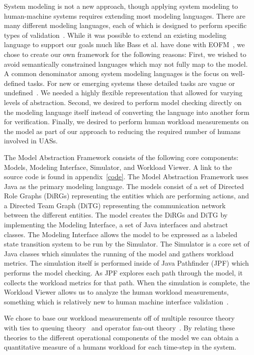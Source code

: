 System modeling is not a new approach, though applying system modeling to human-machine systems requires extending most modeling languages.  There are many different modeling languages, each of which is designed to perform specific types of validation~\cite{bolton2013litreview}.  While it was possible to extend an existing modeling language to support our goals much like Bass et al. have done with EOFM~\cite{bass2011toward}, we chose to create our own framework for the following reasons:  
First, we wished to avoid semantically constrained languages which may not fully map to the model.  A common denominator among system modeling languages is the focus on well-defined tasks.  For new or emerging systems these detailed tasks are vague or undefined~\cite{humphrey2009information}.  We needed a highly flexible representation that allowed for varying levels of abstraction.  
Second, we desired to perform model checking directly on the modeling language itself instead of converting the language into another form for verification.
Finally, we desired to perform human workload measurements on the model as part of our approach to reducing the required number of humans involved in UASs.

The Model Abstraction Framework consists of the following core components:  Models, Modeling Interface, Simulator, and Workload Viewer.  A link to the source code is found in appendix~\ref{code}.  The Model Abstraction Framework uses Java as the primary modeling language.  The models consist of a set of Directed Role Graphs (DiRGs) representing the entities which are performing actions, and a Directed Team Graph (DiTG) representing the communication network between the different entities.  The model creates the DiRGs and DiTG by implementing the Modeling Interface, a set of Java interfaces and abstract classes.  The Modeling Interface allows the model to be expressed as a labeled state transition system to be run by the Simulator.  The Simulator is a core set of Java classes which simulates the running of the model and gathers workload metrics.  The simulation itself is performed inside of Java Pathfinder (JPF) which performs the model checking.  As JPF explores each path through the model, it collects the workload metrics for that path.  When the simulation is complete, the Workload Viewer allows us to analyze the human workload measurements, something which is relatively new to human machine interface validation~\cite{bolton2013litreview}.

We chose to base our workload measurements off of multiple resource theory~\cite{wickens2002multiple} with ties to queuing theory~\cite{newell1994unified} and operator fan-out theory~\cite{goodrich2010fanout}.  By relating these theories to the different operational components of the model we can obtain a quantitative measure of a humans workload for each time-step in the system.

